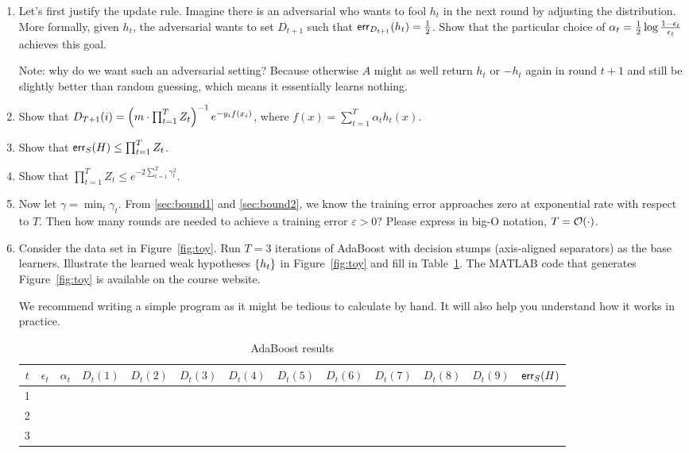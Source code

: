 \begin{enumerate}
\item 
Let's first justify the update rule. 
Imagine there is an adversarial who wants to fool $ h_t $ in the next round by adjusting the distribution. 
More formally, given $ h_t $, the adversarial wants to set $ D_{t+1} $ such that 
$ \mathsf{err}_{D_{t+1}} (h_t) = \frac{1}{2} $. 
Show that the particular choice of $ \alpha_t = \frac{1}{2} \log \frac{1-\epsilon_t}{\epsilon_t} $ achieves this goal. 

Note: why do we want such an adversarial setting? 
Because otherwise $ A $ might as well return $ h_t $ or $ -h_t $ again in round $ t+1 $ and still be slightly better than random guessing, which means it essentially learns nothing.


\item 
Show that 
$ D_{T+1}(i) = \left( m \cdot \prod_{t=1}^{T} Z_t \right)^{-1} e^{- y_i f(x_i)} $, where $ f(x) = \sum_{t=1}^{T} \alpha_t h_t(x) $. 


\item\label{sec:bound1}
Show that $ \mathsf{err}_S(H) \le \prod_{t=1}^{T} Z_t $.


\item\label{sec:bound2} 
Show that $ \prod_{t=1}^{T} Z_t \le e^{-2\sum_{t=1}^{T} \gamma_t^2} $.

\item 
Now let $ \gamma = \min_t \gamma_t $. 
From \ref{sec:bound1} and \ref{sec:bound2}, we know the training error approaches zero at exponential rate with respect to $ T $. 
Then how many rounds are needed
to achieve a training error $ \varepsilon > 0 $? 
Please express in big-O notation, $ T = \mathcal{O} (\cdot) $.


 
\item 
Consider the data set in Figure~\ref{fig:toy}. 
Run $ T=3 $ iterations of AdaBoost with decision stumps (axis-aligned separators) as the base learners.
Illustrate the learned weak hypotheses $ \left\lbrace h_t \right\rbrace $ in Figure~\ref{fig:toy} and fill in Table~\ref{tbl:boost}. 
The MATLAB code that generates Figure~\ref{fig:toy} is available on the course website.

We recommend writing a simple program as it might be tedious to calculate by hand. 
It will also help you understand how it works in practice. 



\begin{table}[h]
\renewcommand{\arraystretch}{1.5}
\centering
\begin{tabular}{|c|c|c|c|c|c|c|c|c|c|c|c|c|}
\hline 
$ t $ 
& $ \epsilon_t $ 
& $ \alpha_t $ 
& $ D_t(1) $ 
& $ D_t(2) $ 
& $ D_t(3) $
& $ D_t(4) $
& $ D_t(5) $
& $ D_t(6) $
& $ D_t(7) $
& $ D_t(8) $
& $ D_t(9) $ 
& $ \mathsf{err}_S(H) $ \\
\hline 
1 & & & & & & & & & & & & \\
\hline 
2 & & & & & & & & & & & & \\
\hline 
3 & & & & & & & & & & & & \\
\hline 
\end{tabular}
\caption{AdaBoost results}
\label{tbl:boost}
\end{table}




\end{enumerate}
